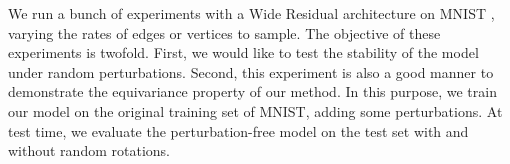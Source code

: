 \documentclass{article}
\begin{document}

We run a bunch of experiments with a Wide Residual architecture on MNIST \citep{lecun-mnisthandwrittendigit-2010}, varying the rates of edges or vertices to sample. The objective of these experiments is twofold. First, we would like to test the stability of the model under random perturbations. Second, this experiment is also a good manner to demonstrate the equivariance property of our method. In this purpose, we train our model on the original training set of MNIST, adding some perturbations. At test time, we evaluate the perturbation-free model on the test set with and without random rotations.
\end{document}
